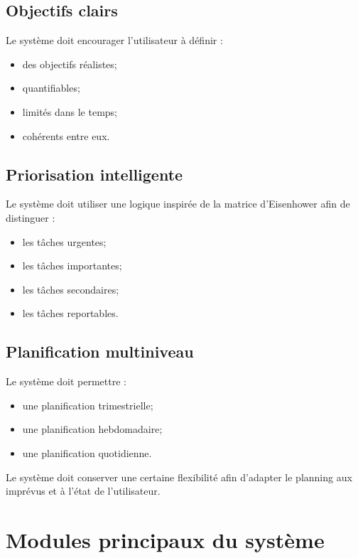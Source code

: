 \documentclass[12pt]{article}
\begin{document}
\subsection{Objectifs clairs}

Le système doit encourager l’utilisateur à définir :
\begin{itemize}
    \item des objectifs réalistes;
    \item quantifiables;
    \item limités dans le temps;
    \item cohérents entre eux.
\end{itemize}

\subsection{Priorisation intelligente}

Le système doit utiliser une logique inspirée de la matrice d’Eisenhower afin de distinguer :
\begin{itemize}
    \item les tâches urgentes;
    \item les tâches importantes;
    \item les tâches secondaires;
    \item les tâches reportables.
\end{itemize}

\subsection{Planification multiniveau}

Le système doit permettre :
\begin{itemize}
    \item une planification trimestrielle;
    \item une planification hebdomadaire;
    \item une planification quotidienne.
\end{itemize}

Le système doit conserver une certaine flexibilité afin d’adapter le planning aux imprévus et à l’état de l’utilisateur.

\section{Modules principaux du système}
\end{document}
